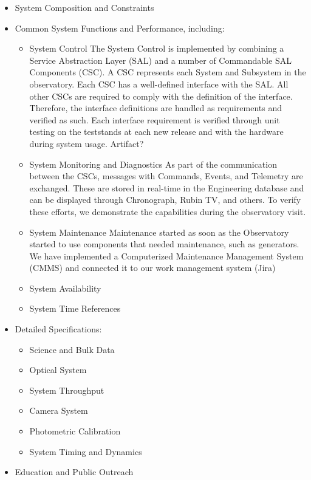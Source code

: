 \begin{itemize}
\item System Composition and Constraints

\item Common System Functions and Performance, including:

	\begin{itemize}
		\item System Control
		The System Control is implemented by combining a Service Abstraction Layer (SAL) and a number of Commandable SAL Components (CSC).
		A CSC represents each System and Subsystem in the observatory.
		Each CSC has a well-defined interface with the SAL. All other CSCs are required to comply with the definition of the interface.
		Therefore, the interface definitions are handled as requirements and verified as such. 
		Each interface requirement is verified through unit testing on the teststands at each new release and with the hardware during system usage.  
		Artifact?
		
		\item System Monitoring and Diagnostics
		As part of the communication between the CSCs, messages with Commands, Events, and Telemetry are exchanged. 
		These are stored in real-time in the Engineering database and can be displayed through Chronograph, Rubin TV, and others.
		To verify these efforts, we demonstrate the capabilities during the observatory visit. 
				
		\item System Maintenance
		Maintenance started as soon as the Observatory started to use components that needed maintenance, such as generators.
		We have implemented a Computerized Maintenance Management System (CMMS) and connected it to our work management system (Jira) 
		
		\item System Availability
		
		\item System Time References
		
	\end{itemize}

\item Detailed Specifications:

	\begin{itemize}
		\item Science and Bulk Data
		\item Optical System
		\item System Throughput
		\item Camera System
		\item Photometric Calibration
		\item System Timing and Dynamics
	\end{itemize}
	
\item Education and Public Outreach

\end{itemize}

